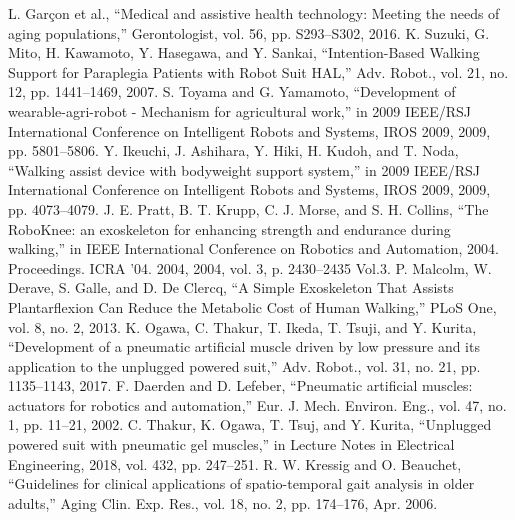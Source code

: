 \documentclass[letterpaper, 10 pt, conference]{ieeeconf}  %
\begin{document}
\begin{thebibliography}{10}

	L. Garçon et al., “Medical and assistive health technology: Meeting the needs of aging populations,” Gerontologist, vol. 56, pp. S293–S302, 2016.
	K. Suzuki, G. Mito, H. Kawamoto, Y. Hasegawa, and Y. Sankai, “Intention-Based Walking Support for Paraplegia Patients with Robot Suit HAL,” Adv. Robot., vol. 21, no. 12, pp. 1441–1469, 2007.
	S. Toyama and G. Yamamoto, “Development of wearable-agri-robot - Mechanism for agricultural work,” in 2009 IEEE/RSJ International Conference on Intelligent Robots and Systems, IROS 2009, 2009, pp. 5801–5806.
	Y. Ikeuchi, J. Ashihara, Y. Hiki, H. Kudoh, and T. Noda, “Walking assist device with bodyweight support system,” in 2009 IEEE/RSJ International Conference on Intelligent Robots and Systems, IROS 2009, 2009, pp. 4073–4079.
	J. E. Pratt, B. T. Krupp, C. J. Morse, and S. H. Collins, “The RoboKnee: an exoskeleton for enhancing strength and endurance during walking,” in IEEE International Conference on Robotics and Automation, 2004. Proceedings. ICRA ’04. 2004, 2004, vol. 3, p. 2430–2435 Vol.3.
	P. Malcolm, W. Derave, S. Galle, and D. De Clercq, “A Simple Exoskeleton That Assists Plantarflexion Can Reduce the Metabolic Cost of Human Walking,” PLoS One, vol. 8, no. 2, 2013.
	K. Ogawa, C. Thakur, T. Ikeda, T. Tsuji, and Y. Kurita, “Development of a pneumatic artificial muscle driven by low pressure and its application to the unplugged powered suit,” Adv. Robot., vol. 31, no. 21, pp. 1135–1143, 2017.
	F. Daerden and D. Lefeber, “Pneumatic artificial muscles: actuators for robotics and automation,” Eur. J. Mech. Environ. Eng., vol. 47, no. 1, pp. 11–21, 2002.
	C. Thakur, K. Ogawa, T. Tsuj, and Y. Kurita, “Unplugged powered suit with pneumatic gel muscles,” in Lecture Notes in Electrical Engineering, 2018, vol. 432, pp. 247–251.
R. W. Kressig and O. Beauchet, “Guidelines for clinical applications of spatio-temporal gait analysis in older adults,” Aging Clin. Exp. Res., vol. 18, no. 2, pp. 174–176, Apr. 2006.
\end{thebibliography}
\end{document}
